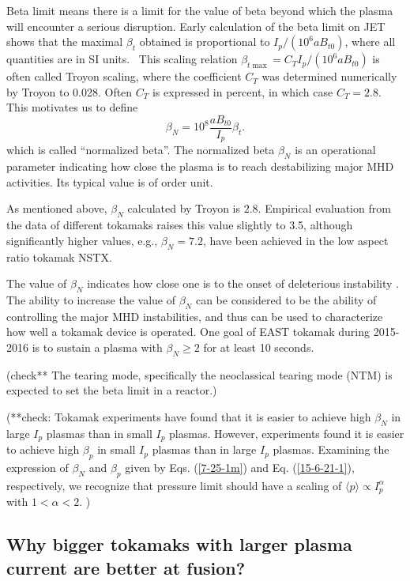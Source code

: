 \documentclass{llncs}
\begin{document}
Beta limit means there is a limit for the value of beta beyond which the
plasma will encounter a serious disruption. Early calculation of the beta
limit on JET shows that the maximal $\beta_t$ obtained is proportional to $I_p
/ (10^6 a B_{t 0})$, where all quantities are in SI units. \ This scaling
relation $\beta_{t \max} = C_T I_p / (10^6 a B_{t 0})$ is often called Troyon
scaling, where the coefficient $C_T$ was determined numerically by Troyon to
0.028. Often $C_T$ is expressed in percent, in which case $C_T = 2.8$. This
motivates us to define
\begin{equation}
  \label{1-13-e1} \beta_N = 10^8 \frac{a B_{t 0}}{I_p} \beta_t .
\end{equation}
which is called ``normalized beta''. The normalized beta $\beta_N$ is an
operational parameter indicating how close the plasma is to reach
destabilizing major MHD activities. Its typical value is of order unit.

As mentioned above, $\beta_N$ calculated by Troyon is $2.8$. Empirical
evaluation from the data of different tokamaks raises this value slightly to
3.5, although significantly higher values, e.g., $\beta_N = 7.2$, have been
achieved in the low aspect ratio tokamak NSTX{\cite{sabbagh2006}}.

The value of $\beta_N$ indicates how close one is to the onset of deleterious
instability . The ability to increase the value of $\beta_N$ can be considered
to be the ability of controlling the major MHD instabilities, and thus can be
used to characterize how well a tokamak device is operated. One goal of EAST
tokamak during 2015-2016 is to sustain a plasma with $\beta_N \geqslant 2$ for
at least 10 seconds.

(check** The tearing mode, specifically the neoclassical tearing mode (NTM)
is expected to set the beta limit in a reactor.)

(**check: Tokamak experiments have found that it is easier to achieve high
$\beta_N$ in large $I_p$ plasmas than in small $I_p$ plasmas. However,
experiments found it is easier to achieve high $\beta_p$ in small $I_p$
plasmas than in large $I_p$ plasmas. Examining the expression of $\beta_N$ and
$\beta_p$ given by Eqs. (\ref{7-25-1m}) and Eq. (\ref{15-6-21-1}),
respectively, we recognize that pressure limit should have a scaling of
$\langle p \rangle \propto I_p^{\alpha}$ with $1 < \alpha < 2$. )

\subsection{Why bigger tokamaks with larger plasma current are better at
fusion?}
\end{document}
